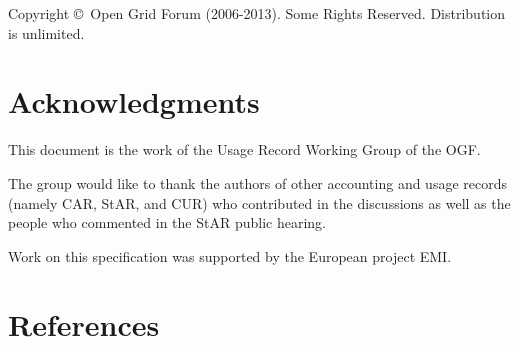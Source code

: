 \documentclass[12pt]{article}  %
\newcommand{\copyrightyears}{2006-2013}  %
\begin{document}
Copyright \copyright \ Open Grid Forum (\copyrightyears).  Some Rights Reserved.  
Distribution is unlimited.







\newpage
{}
\tableofcontents

\newpage


\newpage

\newpage

\newpage

\newpage

\newpage

\newpage

\newpage

\newpage

\newpage

\newpage

\newpage

\newpage

\newpage

\newpage

% 
\newpage


\newpage
\section{Acknowledgments}

This document is the work of the Usage Record Working Group of the OGF.

The group would like to thank the authors of other accounting and usage records (namely CAR, StAR, and CUR) who contributed in the discussions as well as the people who commented in the StAR public hearing.

Work on this specification was supported by the European project EMI. 

\newpage


\newpage
\section{References}

\end{document}
